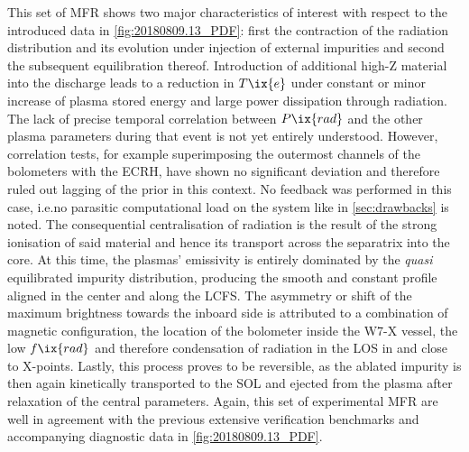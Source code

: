             This set of MFR shows two major characteristics of interest with respect to the introduced data in \cref{fig:20180809.13_PDF}: first the contraction of the radiation distribution and its evolution under injection of external impurities and second the subsequent equilibration thereof. Introduction of additional high-Z material into the discharge leads to a reduction in $T\ix{e}$ under constant or minor increase of plasma stored energy and large power dissipation through radiation. The lack of precise temporal correlation between $P\ix{rad}$ and the other plasma parameters during that event is not yet entirely understood. However, correlation tests, for example superimposing the outermost channels of the bolometers with the ECRH, have shown no significant deviation and therefore ruled out lagging of the prior in this context. No feedback was performed in this case, i.e.no parasitic computational load on the system like in \cref{sec:drawbacks} is noted. The consequential centralisation of radiation is the result of the strong ionisation of said material and hence its transport across the separatrix into the core. At this time, the plasmas' emissivity is entirely dominated by the \textit{quasi} equilibrated impurity distribution, producing the smooth and constant profile aligned in the center and along the LCFS. The asymmetry or shift of the maximum brightness towards the inboard side is attributed to a combination of magnetic configuration, the location of the bolometer inside the W7-X vessel, the low $f\ix{rad}$ and therefore condensation of radiation in the LOS in and close to X-points. Lastly, this process proves to be reversible, as the ablated impurity is then again kinetically transported to the SOL and ejected from the plasma after relaxation of the central parameters. Again, this set of experimental MFR are well in agreement with the previous extensive verification benchmarks and accompanying diagnostic data in \cref{fig:20180809.13_PDF}.%
%
